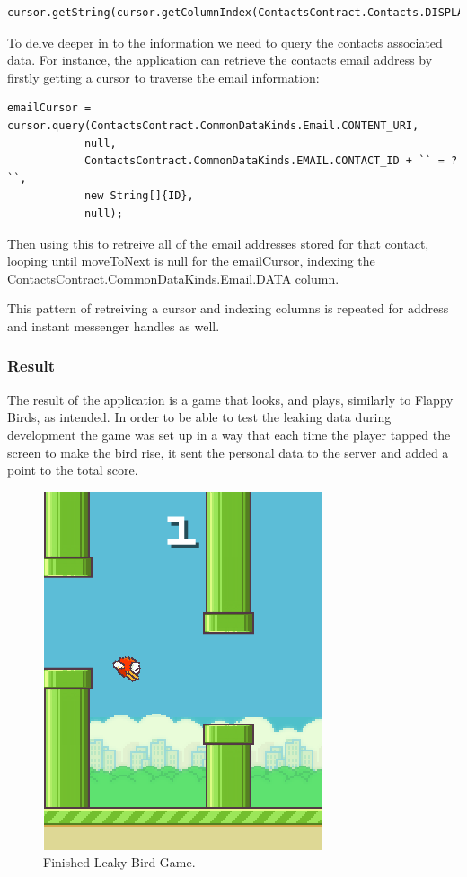 \begin{verbatim}
cursor.getString(cursor.getColumnIndex(ContactsContract.Contacts.DISPLAY_NAME));
\end{verbatim}

To delve deeper in to the information we need to query the contacts associated data. For instance, the application can retrieve the contacts email address by firstly getting a cursor to traverse the email information:

\begin{verbatim}
emailCursor = cursor.query(ContactsContract.CommonDataKinds.Email.CONTENT_URI,
			null,
			ContactsContract.CommonDataKinds.EMAIL.CONTACT_ID + `` = ? ``,
			new String[]{ID},
			null); 
\end{verbatim} 

Then using this to retreive all of the email addresses stored for that contact, looping until moveToNext is null for the emailCursor, indexing the ContactsContract.CommonDataKinds.Email.DATA column.

This pattern of retreiving a cursor and indexing columns is repeated for address and instant messenger handles as well.  

\subsubsection{Result}
The result of the application is a game that looks, and plays, similarly to Flappy Birds, as intended. In order to be able to test the leaking data during development the game was set up in a way that each time the player tapped the screen to make the bird rise, it sent the personal data to the server and added a point to the total score.

\begin{figure}[h!]
\centering\includegraphics{implementation/figures/flappy-b-2.png}
\caption{Finished Leaky Bird Game.}
\end{figure}


\clearpage